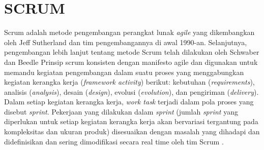 \section{\uppercase{SCRUM}}

\par Scrum adalah metode pengembangan perangkat lunak \textit{agile} yang dikembangkan oleh Jeff Sutherland dan tim pengembangannya di awal 1990-an. Selanjutnya, pengembangan lebih lanjut tentang metode Scrum telah dilakukan oleh Schwaber dan Beedle Prinsip scrum konsisten dengan manifesto agile dan digunakan untuk memandu kegiatan pengembangan dalam suatu proses yang menggabungkan kegiatan kerangka kerja (\textit{framework activity}) berikut: kebutuhan (\textit{requirements}), analisis (\textit{analysis}), desain (\textit{design}), evolusi (\textit{evolution}), dan pengiriman (\textit{delivery}). Dalam setiap kegiatan kerangka kerja, \textit{work task} terjadi dalam pola proses yang disebut \textit{sprint}. Pekerjaan yang dilakukan dalam \textit{sprint} (jumlah \textit{sprint} yang diperlukan untuk setiap kegiatan kerangka kerja akan bervariasi tergantung pada kompleksitas dan ukuran produk) disesuaikan dengan masalah yang dihadapi dan didefinisikan dan sering dimodifikasi secara real time oleh tim Scrum \citep{Ereiz2019}.

